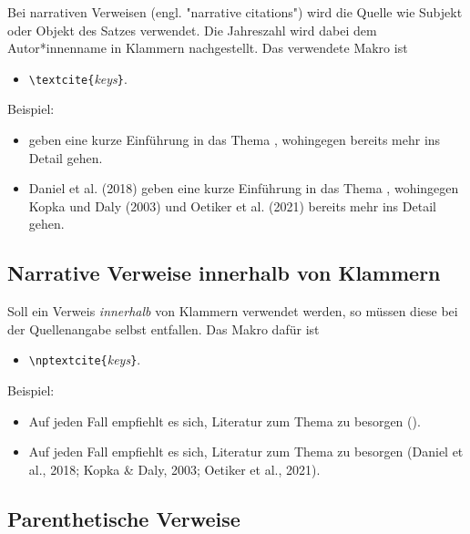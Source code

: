 Bei narrativen Verweisen (engl. "narrative citations") wird die Quelle wie
Subjekt oder Objekt des Satzes verwendet. Die Jahreszahl wird dabei dem
Autor*innenname in Klammern nachgestellt. Das verwendete Makro ist
%
\begin{itemize}
    \item[] \verb!\textcite{!\textit{keys}\verb!}!.
\end{itemize}
%
Beispiel:
%
\begin{itemize}
\item[]
\begin{LaTeXCode}[numbers=none,breakindent=0pt]
\textcite{Daniel2018} geben eine kurze Einführung in das Thema \latex,
wohingegen \textcite{Oetiker2021, Kopka2003} bereits mehr ins Detail gehen.
\end{LaTeXCode}
\item[]
    Daniel et al. (2018) geben eine kurze Einführung in das Thema \latex,
    wohingegen Kopka und Daly (2003) und Oetiker et al. (2021) bereits mehr ins
    Detail gehen.
\end{itemize}


\subsection{Narrative Verweise innerhalb von Klammern}

Soll ein Verweis \emph{innerhalb} von Klammern verwendet werden, so müssen
diese bei der Quellenangabe selbst entfallen. Das Makro dafür ist
%
\begin{itemize}
    \item[] \verb!\nptextcite{!\textit{keys}\verb!}!.
\end{itemize}
%
Beispiel:
%
\begin{itemize}
\item[]
\begin{LaTeXCode}[numbers=none,breakindent=0pt]
Auf jeden Fall empfiehlt es sich, Literatur zum Thema \latex zu besorgen
(\zB {}).
\end{LaTeXCode}
\item[]
    Auf jeden Fall empfiehlt es sich, Literatur zum Thema \latex zu besorgen
    (\zB Daniel et al., 2018; Kopka \& Daly, 2003; Oetiker et al., 2021).
\end{itemize}

\subsection{Parenthetische Verweise}

